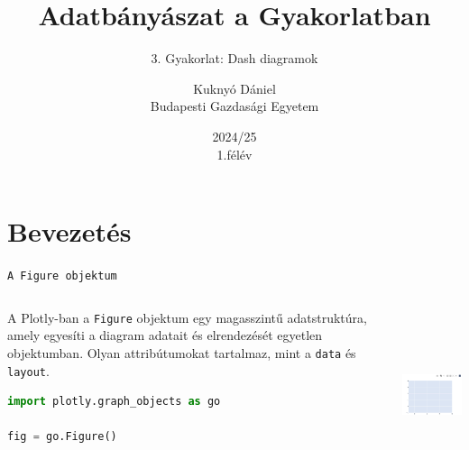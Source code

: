 \documentclass[english, aspectratio=169]{beamer}
\makeatletter
\newcommand\makebeamertitle{\frame{\maketitle}}
\let\origtableofcontents=\tableofcontents
\def\tableofcontents{\@ifnextchar[{\origtableofcontents}{\gobbletableofcontents}}
\def\gobbletableofcontents#1{\origtableofcontents}
\makeatother
\begin{document}
\section{Bevezetés}
\title[]{Adatbányászat a Gyakorlatban}
\subtitle{3. Gyakorlat: Dash diagramok}
\author[Kuknyó Dániel]{Kuknyó Dániel\\Budapesti Gazdasági Egyetem}
\date{2024/25\\1.félév}
\makebeamertitle

\begin{frame}
\tableofcontents{}
\end{frame}

\begin{frame}
\tableofcontents[currentsection]
\end{frame}

\begin{frame}[fragile]{\texttt{A Figure objektum}}
	\begin{columns}
		\begin{column}{.5\textwidth}
			A Plotly-ban a \texttt{Figure} objektum egy magasszintű adatstruktúra, amely egyesíti a diagram adatait és elrendezését egyetlen objektumban. Olyan attribútumokat tartalmaz, mint a \texttt{data} és \texttt{layout}.
			\vspace{0.2cm}
			\begin{lstlisting}[language=python]
import plotly.graph_objects as go

fig = go.Figure()
			\end{lstlisting}
		\end{column}
		\begin{column}{.5\textwidth}
			\begin{center}
				\includegraphics[width=5cm, height=5cm, keepaspectratio]{images/plots_1.png}
			\end{center}
		\end{column}
	\end{columns}
\end{frame}
\end{document}
